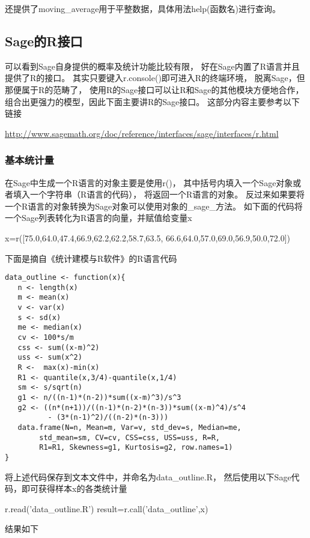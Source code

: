 还提供了moving\_average用于平整数据，具体用法help(函数名)进行查询。

\subsection{Sage的R接口}
可以看到Sage自身提供的概率及统计功能比较有限，
好在Sage内置了R语言并且提供了R的接口。
其实只要键入r.console()即可进入R的终端环境，
脱离Sage，但那便属于R的范畴了，
使用R的Sage接口可以让R和Sage的其他模块方便地合作，
组合出更强力的模型，因此下面主要讲R的Sage接口。
这部分内容主要参考以下链接

\href{http://www.sagemath.org/doc/reference/interfaces/sage/interfaces/r.html}{http://www.sagemath.org/doc/reference/interfaces/sage/interfaces/r.html}

\subsubsection{基本统计量}
在Sage中生成一个R语言的对象主要是使用r()，
其中括号内填入一个Sage对象或者填入一个字符串（R语言的代码），
将返回一个R语言的对象。
反过来如果要将一个R语言的对象转换为Sage对象可以使用对象的\_sage\_方法。
如下面的代码将一个Sage列表转化为R语言的向量，并赋值给变量x
\begin{sageblock}
x=r([75.0,64.0,47.4,66.9,62.2,62.2,58.7,63.5,
66.6,64.0,57.0,69.0,56.9,50.0,72.0])
\end{sageblock}
下面是摘自《统计建模与R软件》的R语言代码
\begin{lstlisting}
data_outline <- function(x){
   n <- length(x)
   m <- mean(x)
   v <- var(x)
   s <- sd(x)
   me <- median(x)
   cv <- 100*s/m
   css <- sum((x-m)^2)
   uss <- sum(x^2)
   R <-  max(x)-min(x)
   R1 <- quantile(x,3/4)-quantile(x,1/4)
   sm <- s/sqrt(n)
   g1 <- n/((n-1)*(n-2))*sum((x-m)^3)/s^3
   g2 <- ((n*(n+1))/((n-1)*(n-2)*(n-3))*sum((x-m)^4)/s^4
          - (3*(n-1)^2)/((n-2)*(n-3)))
   data.frame(N=n, Mean=m, Var=v, std_dev=s, Median=me, 
        std_mean=sm, CV=cv, CSS=css, USS=uss, R=R, 
        R1=R1, Skewness=g1, Kurtosis=g2, row.names=1)
}
\end{lstlisting}
将上述代码保存到文本文件中，并命名为data\_outline.R，
然后使用以下Sage代码，即可获得样本x的各类统计量
\begin{sageblock}
r.read('data_outline.R')
result=r.call('data_outline',x)
\end{sageblock}

结果如下


